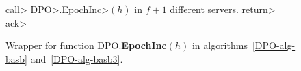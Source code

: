 \begin{figure}[ht]
	\begin{algorithm}[H]
          \caption{\small Wrapper for function DPO.\textbf{EpochInc}$(h)$ in algorithms~\ref{DPO-alg-basb} and~\ref{DPO-alg-basb3}.}
          \label{DPO-wEpochInc23}
          \begin{algorithmic}[1]
			\State \<call> \<DPO>.\<EpochInc>\((h)\) in \(f+1\) different servers.
			\State \<return> \<ack>
			\EndFunction
		\end{algorithmic}
	\end{algorithm}\vspace{-2em}
\end{figure}
